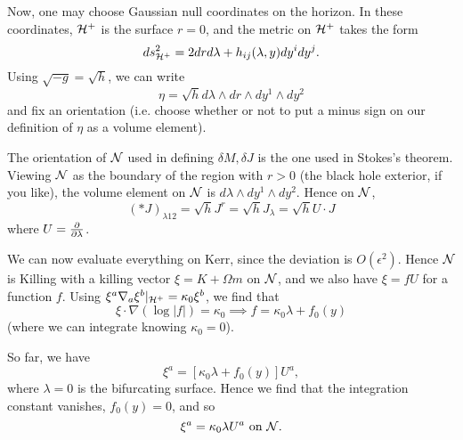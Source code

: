 Now, one may choose Gaussian null coordinates on the horizon. In these coordinates, $\cH^+$ is the surface $r=0$, and the metric on $\cH^+$ takes the form
\begin{equation}
     ds^2_{\cH^+}= 2drd\lambda +h_{ij}(\lambda,y) dy^i dy^j.
\end{equation}
Using $\sqrt{-g}=\sqrt{h}$, we can write
\begin{equation}
    \eta=\sqrt{h} d\lambda \wedge dr \wedge dy^1 \wedge dy^2
\end{equation}
and fix an orientation (i.e. choose whether or not to put a minus sign on our definition of $\eta$ as a volume element).

The orientation of $\cN$ used in defining $\delta M, \delta J$ is the one used in Stokes's theorem. Viewing $\cN$ as the boundary of the region with $r>0$ (the black hole exterior, if you like), the volume element on $\cN$ is $d\lambda \wedge dy^1 \wedge dy^2$. Hence on $\cN$,
\begin{equation}
    (*J)_{\lambda 12} = \sqrt{h} J^r = \sqrt{h} J_\lambda = \sqrt{h} U\cdot J
\end{equation}
where $U=\P{}{\lambda}$.

We can now evaluate everything on Kerr, since the deviation is $O(\epsilon^2)$. Hence $\cN$ is Killing with a killing vector $\xi=K+\Omega m$ on $\cN$, and we also have $\xi=f U$ for a function $f$. Using $\xi^a \nabla_a \xi^b|_{\cH^+}=\kappa_0 \xi^b$, we find that
\begin{equation}
    \xi \cdot \nabla( \log|f|)=\kappa_0 \implies f= \kappa_0 \lambda + f_0(y)
\end{equation}
(where we can integrate knowing $\kappa_0=0$).

So far, we have
\begin{equation}
     \xi^a = [\kappa_0 \lambda +f_0(y)]U^a,
\end{equation}
where $\lambda=0$ is the bifurcating surface. Hence we find that the integration constant vanishes, $f_0(y)=0$, and so
\begin{equation}
    \xi^a = \kappa_0 \lambda U^a\text{ on } \cN.
\end{equation}

